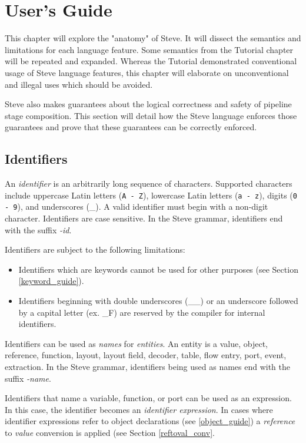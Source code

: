 \chapter{User's Guide} \label{users_guide}

This chapter will explore the "anatomy" of Steve. It will dissect the semantics and limitations for each language feature. Some semantics from the Tutorial chapter will be repeated and expanded. Whereas the Tutorial demonstrated conventional usage of Steve language features, this chapter will elaborate on unconventional and illegal uses which should be avoided.

Steve also makes guarantees about the logical correctness and safety of pipeline stage composition. This section will detail how the Steve language enforces those guarantees and prove that these guarantees can be correctly enforced.

\section{Identifiers} \label{identifiers_guide}

An \textit{identifier} is an arbitrarily long sequence of characters. Supported characters include uppercase Latin letters (\texttt{A - Z}), lowercase Latin letters (\texttt{a - z}), digits (\texttt{0 - 9}), and underscores (\_). A valid identifier must begin with a non-digit character. Identifiers are case sensitive. In the Steve grammar, identifiers end with the suffix \textit{-id}.

Identifiers are subject to the following limitations:

\begin{itemize}
\item Identifiers which are keywords cannot be used for other purposes (see Section \ref{keyword_guide}).

\item Identifiers beginning with double underscores (\_\_) or an underscore followed by a capital letter (ex. \_F) are reserved by the compiler for internal identifiers.
\end{itemize}

Identifiers can be used as \textit{names} for \textit{entities}. An entity is a value, object, reference, function, layout, layout field, decoder, table, flow entry, port, event, extraction. In the Steve grammar, identifiers being used as names end with the suffix \textit{-name}.

Identifiers that name a variable, function, or port can be used as an expression. In this case, the identifier becomes an \textit{identifier expression}. In cases where identifier expressions refer to object declarations (see \ref{object_guide}) a \textit{reference} to \textit{value} conversion is applied (see Section \ref{reftoval_conv}.

